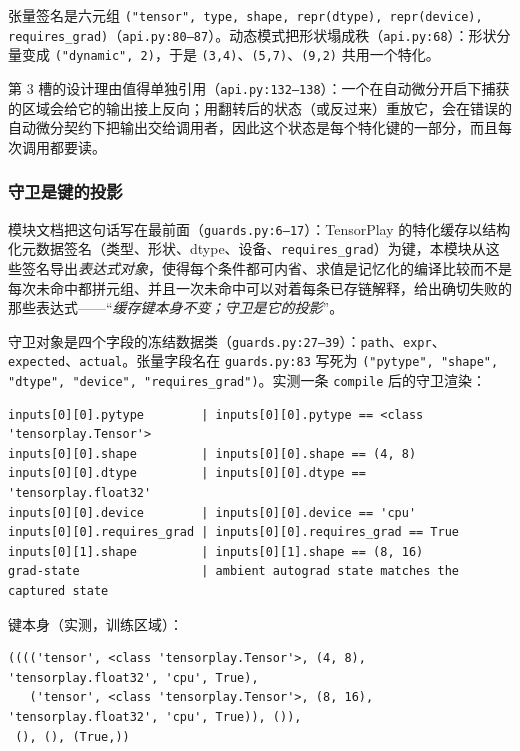 张量签名是六元组 \texttt{("tensor", type, shape, repr(dtype), repr(device), requires\_grad)}（\texttt{api.py:80--87}）。动态模式把形状塌成秩（\texttt{api.py:68}）：形状分量变成 \texttt{("dynamic", 2)}，于是 \texttt{(3,4)}、\texttt{(5,7)}、\texttt{(9,2)} 共用一个特化。

第 3 槽的设计理由值得单独引用（\texttt{api.py:132--138}）：一个在自动微分开启下捕获的区域会给它的输出接上反向；用翻转后的状态（或反过来）重放它，会在错误的自动微分契约下把输出交给调用者，因此这个状态是每个特化键的一部分，而且每次调用都要读。

\subsubsection{守卫是键的投影}

模块文档把这句话写在最前面（\texttt{guards.py:6--17}）：TensorPlay 的特化缓存以结构化元数据签名（类型、形状、dtype、设备、\texttt{requires\_grad}）为键，本模块从这些签名导出\emph{表达式对象}，使得每个条件都可内省、求值是记忆化的编译比较而不是每次未命中都拼元组、并且一次未命中可以对着每条已存链解释，给出确切失败的那些表达式——“\emph{缓存键本身不变；守卫是它的投影}”。

守卫对象是四个字段的冻结数据类（\texttt{guards.py:27--39}）：\texttt{path}、\texttt{expr}、\texttt{expected}、\texttt{actual}。张量字段名在 \texttt{guards.py:83} 写死为 \texttt{("pytype", "shape", "dtype", "device", "requires\_grad")}。实测一条 \texttt{compile} 后的守卫渲染：

\begin{lstlisting}[caption={实测守卫渲染（\texttt{GuardChain.guards}）。}, label=lst:fe:guards, style=pystyle]
inputs[0][0].pytype        | inputs[0][0].pytype == <class 'tensorplay.Tensor'>
inputs[0][0].shape         | inputs[0][0].shape == (4, 8)
inputs[0][0].dtype         | inputs[0][0].dtype == 'tensorplay.float32'
inputs[0][0].device        | inputs[0][0].device == 'cpu'
inputs[0][0].requires_grad | inputs[0][0].requires_grad == True
inputs[0][1].shape         | inputs[0][1].shape == (8, 16)
grad-state                 | ambient autograd state matches the captured state
\end{lstlisting}

键本身（实测，训练区域）：

\begin{lstlisting}[caption={实测特化键。}, label=lst:fe:keydump, style=pystyle]
(((('tensor', <class 'tensorplay.Tensor'>, (4, 8), 'tensorplay.float32', 'cpu', True),
   ('tensor', <class 'tensorplay.Tensor'>, (8, 16), 'tensorplay.float32', 'cpu', True)), ()),
 (), (), (True,))
\end{lstlisting}

